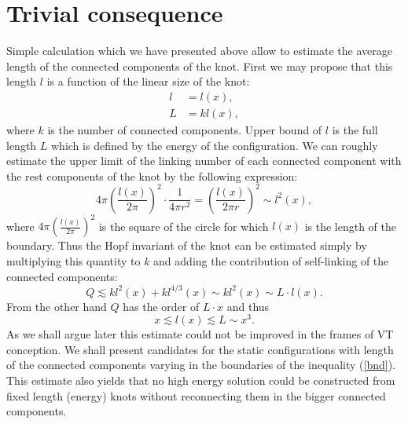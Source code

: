 \documentclass[a4paper,12pt]{article}
\begin{document}
\section{Trivial consequence}
	Simple calculation which we have presented above allow
	to estimate the average length of the connected components
	of the knot. First we may propose that this length 
    $ l $
	is a function of the linear size of the knot:
\begin{align}
    l & = l(x), \\
    L & = k l(x) ,
\end{align}
	where 
    $ k $
	is the number of connected components.
	Upper bound of 
    $ l $ 
	is the full length 
    $ L $
	which is defined by the energy of the configuration.
	We can roughly estimate the upper limit of the linking
	number of each connected component with the rest components
	of the knot by the following expression:
\begin{equation}
    4 \pi (\frac{l(x)}{2 \pi})^{2} \cdot \frac{1}{4 \pi r^{2}} =
	(\frac{l(x)}{2 \pi r})^{2} \sim l^{2}(x) ,
\end{equation}
	where 
    $ 4 \pi (\frac{l(x)}{2 \pi})^{2} $
	is the square of the circle for which 
    $ l(x) $
	is the length of the boundary.
	Thus the Hopf invariant of the knot can be estimated simply by
	multiplying this quantity to 
    $ k $
	and adding the contribution of self-linking of the
	connected components:
\begin{equation}
    Q \lesssim k l^{2}(x) + k l^{4/3}(x) \sim k l^{2}(x) \sim L \cdot l(x) .
\end{equation}
	From the other hand
    $ Q $
	has the order of 
    $ L \cdot x $
	and thus
\begin{equation}
\label{bnd}
    x \lesssim l(x) \lesssim L \sim x^{3} .
\end{equation}
	As we shall argue later this estimate could not be improved
	in the frames of VT conception. We shall present candidates
	for the static configurations with length of the connected
	components varying in the boundaries of the inequality
(\ref{bnd}).
	This estimate also yields that no high energy solution
	could be constructed from fixed length (energy) knots without
	reconnecting them in the bigger connected components.
\end{document}
